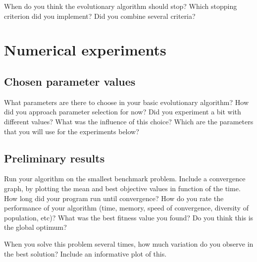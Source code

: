 \documentclass[a4paper,10pt]{article}
\newcommand{\ReplaceMe}[1]{{\color{blue}#1}}
\begin{document}
\ReplaceMe{When do you think the evolutionary algorithm should stop? Which stopping criterion did you implement? Did you combine several criteria?}


\section{Numerical experiments}

\subsection{Chosen parameter values}

\ReplaceMe{What parameters are there to choose in your basic evolutionary algorithm? How did you approach parameter selection for now? Did you experiment a bit with different values? What was the influence of this choice? Which are the parameters that you will use for the experiments below?}

\subsection{Preliminary results}

\ReplaceMe{Run your algorithm on the smallest benchmark problem. Include a convergence graph, by plotting the mean and best objective values in function of the time. How long did your program run until convergence? How do you rate the performance of your algorithm (time, memory, speed of convergence, diversity of population, etc)? What was the best fitness value you found? Do you think this is the global optimum? 

When you solve this problem several times, how much variation do you observe in the best solution? Include an informative plot of this.}

% 
% 

% 
\end{document}
